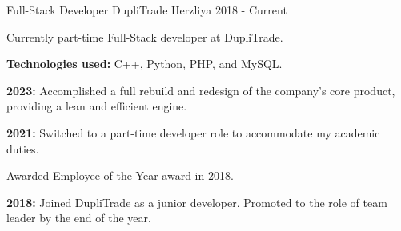 

\begin{cventries}

  \cventry
    {Full-Stack Developer} %
    {DupliTrade} %
    {Herzliya} %
    {2018 - Current} %
    {
      \begin{cvitems} %
        \item {Currently part-time Full-Stack developer at DupliTrade.}
        \item {\textbf{Technologies used:} C++, Python, PHP, and MySQL.}
        \item {\textbf{2023:} Accomplished a full rebuild and redesign of the company's core product, providing a lean and efficient engine.}
        \item {\textbf{2021:} Switched to a part-time developer role to accommodate my academic duties.}
        \item {Awarded Employee of the Year award in 2018.}
        \item {\textbf{2018:} Joined DupliTrade as a junior developer. Promoted to the role of team leader by the end of the year.}
      \end{cvitems}
    }

\end{cventries}
